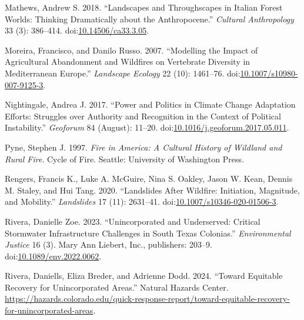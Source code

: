 \documentclass[
]{article}
\newlength{\cslhangindent}
\newenvironment{CSLReferences}[2] %
 {\begin{list}{}{%
  \setlength{\itemindent}{0pt}
  \setlength{\leftmargin}{0pt}
  \setlength{\parsep}{0pt}
  \ifodd #1
   \setlength{\leftmargin}{\cslhangindent}
   \setlength{\itemindent}{-1\cslhangindent}
  \fi
  \setlength{\itemsep}{#2\baselineskip}}}
 {\end{list}}
\begin{document}
\begin{CSLReferences}{1}{0}
Mathews, Andrew S. 2018. {``Landscapes and {Throughscapes} in {Italian Forest Worlds}: {Thinking Dramatically} about the {Anthropocene}.''} \emph{Cultural Anthropology} 33 (3): 386--414. doi:\href{https://doi.org/10.14506/ca33.3.05}{10.14506/ca33.3.05}.

Moreira, Francisco, and Danilo Russo. 2007. {``Modelling the Impact of Agricultural Abandonment and Wildfires on Vertebrate Diversity in {Mediterranean Europe}.''} \emph{Landscape Ecology} 22 (10): 1461--76. doi:\href{https://doi.org/10.1007/s10980-007-9125-3}{10.1007/s10980-007-9125-3}.

Nightingale, Andrea J. 2017. {``Power and Politics in Climate Change Adaptation Efforts: {Struggles} over Authority and Recognition in the Context of Political Instability.''} \emph{Geoforum} 84 (August): 11--20. doi:\href{https://doi.org/10.1016/j.geoforum.2017.05.011}{10.1016/j.geoforum.2017.05.011}.

Pyne, Stephen J. 1997. \emph{Fire in {America}: A Cultural History of Wildland and Rural Fire}. Cycle of Fire. Seattle: University of Washington Press.

Rengers, Francis K., Luke A. McGuire, Nina S. Oakley, Jason W. Kean, Dennis M. Staley, and Hui Tang. 2020. {``Landslides After Wildfire: Initiation, Magnitude, and Mobility.''} \emph{Landslides} 17 (11): 2631--41. doi:\href{https://doi.org/10.1007/s10346-020-01506-3}{10.1007/s10346-020-01506-3}.

Rivera, Danielle Zoe. 2023. {``Unincorporated and {Underserved}: {Critical Stormwater Infrastructure Challenges} in {South Texas Colonias}.''} \emph{Environmental Justice} 16 (3). Mary Ann Liebert, Inc., publishers: 203--9. doi:\href{https://doi.org/10.1089/env.2022.0062}{10.1089/env.2022.0062}.

Rivera, Daniells, Eliza Breder, and Adrienne Dodd. 2024. {``Toward {Equitable Recovery} for {Unincorporated Areas}.''} Natural Hazards Center. \url{https://hazards.colorado.edu/quick-response-report/toward-equitable-recovery-for-unincorporated-areas}.


\end{CSLReferences}
\end{document}
